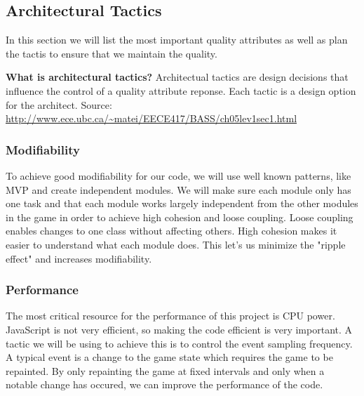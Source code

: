\subsection{Architectural Tactics}
In this section we will list the most important quality attributes as well as plan the tactis to 
ensure that we maintain the quality.

{\bf What is architectural tactics? }
Architectual tactics are design decisions that influence the control of a quality attribute reponse. 
Each tactic is a design option for the architect. 
Source: \url{http://www.ece.ubc.ca/~matei/EECE417/BASS/ch05lev1sec1.html}

\subsubsection{Modifiability}
To achieve good modifiability for our code, we will use well known patterns, like MVP and create 
independent modules. We will make sure each module only has one task and that each module works 
largely independent from the other modules in the game in order to achieve high cohesion and loose 
coupling. Loose coupling enables changes to one class without affecting others. High cohesion makes 
it easier to understand what each module does. This let's us minimize the "ripple effect" and 
increases modifiability.

\subsubsection{Performance}
The most critical resource for the performance of this project is CPU power. JavaScript is not very 
efficient, so making the code efficient is very important. A tactic we will be using to achieve this 
is to control the event sampling frequency. A typical event is a change to the game state which 
requires the game to be repainted. By only repainting the game at fixed intervals and only when a 
notable change has occured, we can improve the performance of the code.
